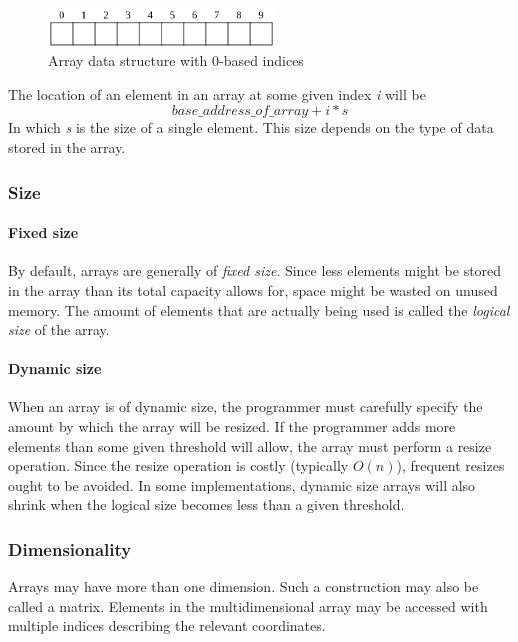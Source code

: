 \documentclass{article}
\begin{document}
{\begin{figure}[H]
  \centering
  \includegraphics[width=6cm]{array}
  \caption{Array data structure with 0-based indices}
\end{figure}

The location of an element in an array at some given index {\em i} will be
\[base\_address\_of\_array + i * s\]
In which {\em s} is the size of a single element. This size depends on the type of data stored in the array.

\subsubsection{Size}
\paragraph{Fixed size}
By default, arrays are generally of {\em fixed size}. Since less elements might be stored in the array than its total
capacity allows for, space might be wasted on unused memory. The amount of elements that are actually being used is
called the {\em logical size} of the array.

\paragraph{Dynamic size}
When an array is of dynamic size, the programmer must carefully specify the amount by which the array will be resized.
If the programmer adds more elements than some given threshold will allow, the array must perform a resize operation.
Since the resize operation is costly (typically \(O(n)\)), frequent resizes ought to be avoided. In some implementations,
dynamic size arrays will also shrink when the logical size becomes less than a given threshold.

\subsubsection{Dimensionality}
Arrays may have more than one dimension. Such a construction may also be called a matrix.
Elements in the multidimensional array may be accessed with multiple indices describing the relevant coordinates.


\newpage


}
\end{document}
